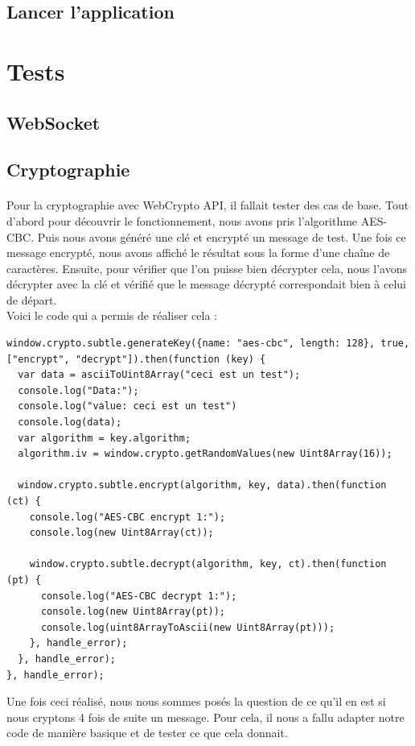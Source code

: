 \documentclass[a4paper,12pt]{report}
\begin{document}
	\subsection{Lancer l'application}
	
\newpage	
\section{Tests}
	\subsection{WebSocket}
	
	\subsection{Cryptographie}
	\paragraph*{}
	Pour la cryptographie avec WebCrypto API, il fallait tester des cas de base. Tout d'abord pour découvrir le fonctionnement, nous avons pris l'algorithme AES-CBC. Puis nous avons généré une clé et encrypté un message de test. Une fois ce message encrypté, nous avons affiché le résultat sous la forme d'une chaîne de caractères. Ensuite, pour vérifier que l'on puisse bien décrypter cela, nous l'avons décrypter avec la clé et vérifié que le message décrypté correspondait bien à celui de départ.\\
	Voici le code qui a permis de réaliser cela :
	\begin{lstlisting}
window.crypto.subtle.generateKey({name: "aes-cbc", length: 128}, true, ["encrypt", "decrypt"]).then(function (key) {
  var data = asciiToUint8Array("ceci est un test");
  console.log("Data:");
  console.log("value: ceci est un test")
  console.log(data);
  var algorithm = key.algorithm;
  algorithm.iv = window.crypto.getRandomValues(new Uint8Array(16));

  window.crypto.subtle.encrypt(algorithm, key, data).then(function (ct) {
    console.log("AES-CBC encrypt 1:");
    console.log(new Uint8Array(ct));

    window.crypto.subtle.decrypt(algorithm, key, ct).then(function (pt) {
      console.log("AES-CBC decrypt 1:");
      console.log(new Uint8Array(pt));
      console.log(uint8ArrayToAscii(new Uint8Array(pt)));
    }, handle_error);
  }, handle_error);
}, handle_error);
	\end{lstlisting}
	Une fois ceci réalisé, nous nous sommes posés la question de ce qu'il en est si nous cryptons 4 fois de suite un message. Pour cela, il nous a fallu adapter notre code de manière basique et de tester ce que cela donnait.\\
\end{document}
